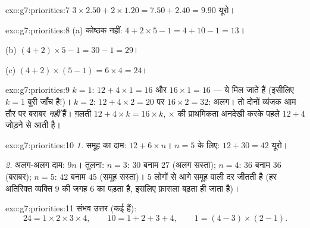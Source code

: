 \begin{solution}{exo:g7:priorities:7}
$3 \times 2.50 + 2 \times 1.20 = 7.50 + 2.40 = 9.90$ यूरो।
\end{solution}

\begin{solution}{exo:g7:priorities:8}
(a) कोष्ठक नहीं: $4 + 2 \times 5 - 1 = 4 + 10 - 1 = 13$।

(b) $(4 + 2) \times 5 - 1 = 30 - 1 = 29$।

(c) $(4 + 2) \times (5 - 1) = 6 \times 4 = 24$।
\end{solution}

\begin{solution}{exo:g7:priorities:9}
$k = 1$: $12 + 4 \times 1 = 16$ और $16 \times 1 = 16$ --- ये मिल
जाते हैं (इसीलिए $k = 1$ बुरी जाँच है!)। $k = 2$:
$12 + 4 \times 2 = 20$ पर $16 \times 2 = 32$: अलग। तो दोनों
व्यंजक आम तौर पर बराबर \emph{नहीं} हैं। ग़लती
$12 + 4 \times k = 16 \times k$, $\times$ की प्राथमिकता अनदेखी
करके पहले $12 + 4$ जोड़ने से आती है।
\end{solution}

\begin{solution}{exo:g7:priorities:10}
\emph{1.} समूह का दाम: $12 + 6 \times n$। $n = 5$ के लिए:
$12 + 30 = 42$ यूरो।

\emph{2.} अलग-अलग दाम: $9n$। तुलना: $n = 3$: $30$ बनाम $27$
(अलग सस्ता); $n = 4$: $36$ बनाम $36$ (बराबर); $n = 5$: $42$ बनाम
$45$ (समूह सस्ता)। $5$ लोगों से आगे समूह वाली दर जीतती है
(हर अतिरिक्त व्यक्ति $9$ की जगह $6$ का पड़ता है, इसलिए फ़ासला बढ़ता ही जाता है)।
\end{solution}

\begin{solution}{exo:g7:priorities:11}
संभव उत्तर (कई हैं):
\[
24 = 1 \times 2 \times 3 \times 4, \qquad
10 = 1 + 2 + 3 + 4, \qquad
1 = (4 - 3) \times (2 - 1).
\]
\end{solution}

